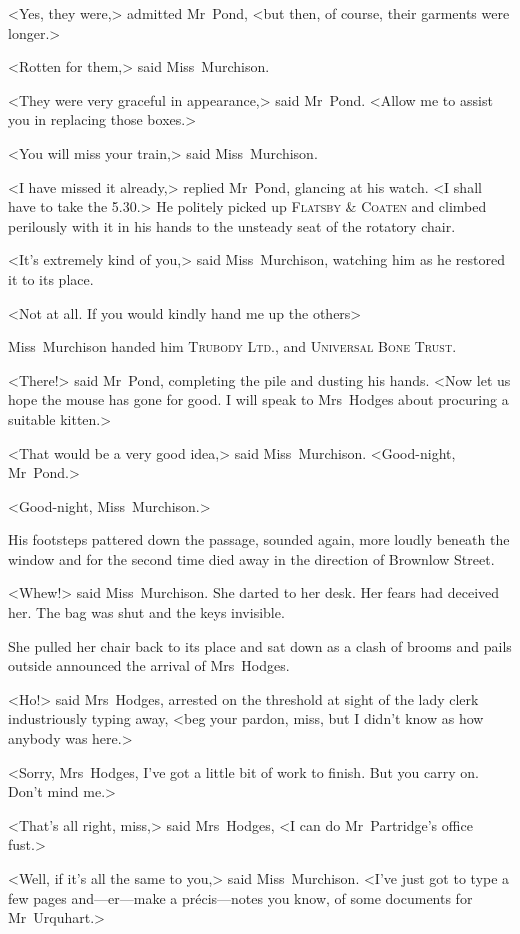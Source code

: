 <Yes, they were,> admitted Mr~Pond, <but then, of course, their garments were longer.>

<Rotten for them,> said Miss~Murchison.

<They were very graceful in appearance,> said Mr~Pond. <Allow me to assist you in replacing those boxes.>

<You will miss your train,> said Miss~Murchison.

<I have missed it already,> replied Mr~Pond, glancing at his watch. <I shall have to take the 5.30.> He politely picked up \textsc{Flatsby \& Coaten} and climbed perilously with it in his hands to the unsteady seat of the rotatory chair.

<It's extremely kind of you,> said Miss~Murchison, watching him as he restored it to its place.

<Not at all. If you would kindly hand me up the others\longdash>

Miss~Murchison handed him \textsc{Trubody Ltd.}, and \textsc{Universal Bone Trust}.

<There!> said Mr~Pond, completing the pile and dusting his hands. <Now let us hope the mouse has gone for good. I will speak to Mrs~Hodges about procuring a suitable kitten.>

<That would be a very good idea,> said Miss~Murchison. <Good-night, Mr~Pond.>

<Good-night, Miss~Murchison.>

His footsteps pattered down the passage, sounded again, more loudly beneath the window and for the second time died away in the direction of Brownlow Street.

<Whew!> said Miss~Murchison. She darted to her desk. Her fears had deceived her. The bag was shut and the keys invisible.

She pulled her chair back to its place and sat down as a clash of brooms and pails outside announced the arrival of Mrs~Hodges.

<Ho!> said Mrs~Hodges, arrested on the threshold at sight of the lady clerk industriously typing away, <beg your pardon, miss, but I didn't know as how anybody was here.>

<Sorry, Mrs~Hodges, I've got a little bit of work to finish. But you carry on. Don't mind me.>

<That's all right, miss,> said Mrs~Hodges, <I can do Mr~Partridge's office fust.>

<Well, if it's all the same to you,> said Miss~Murchison. <I've just got to type a few pages and—er—make a précis—notes you know, of some documents for Mr~Urquhart.>

